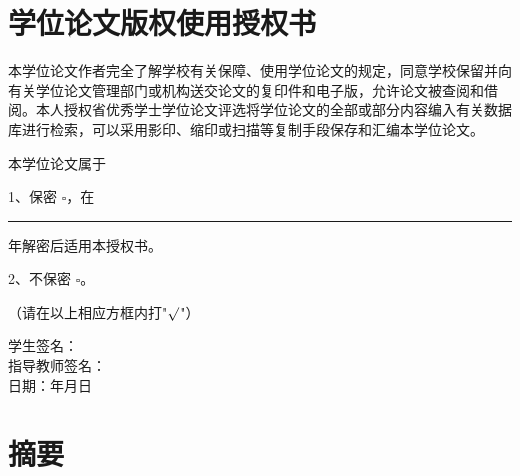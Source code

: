 \documentclass[zihao=-4,a4paper]{ctexart}
\numberwithin{figure}{section}
\numberwithin{table}{section}
\begin{document}
\newpage
\section*{学位论文版权使用授权书}
\thispagestyle{empty}

\vspace{1cm}

{\songti
本学位论文作者完全了解学校有关保障、使用学位论文的规定，同意学校保留并向有关学位论文管理部门或机构送交论文的复印件和电子版，允许论文被查阅和借阅。本人授权省优秀学士学位论文评选将学位论文的全部或部分内容编入有关数据库进行检索，可以采用影印、缩印或扫描等复制手段保存和汇编本学位论文。

\vspace{1cm}

本学位论文属于

\vspace{0.5cm}

1、保密 $\square$，在\rule{1cm}{0.3pt}年解密后适用本授权书。

\vspace{0.3cm}

2、不保密 $\square$。

\vspace{0.3cm}

（请在以上相应方框内打"$\surd$"）

\vspace{2cm}

\begin{flushright}
学生签名：\hspace{3cm}\\
\vspace{0.5cm}
指导教师签名：\hspace{3cm}\\
\vspace{0.5cm}
日\hspace{2em}期：\hspace{1cm}年\hspace{1cm}月\hspace{1cm}日
\end{flushright}
}

\newpage
\section*{摘\hspace{2em}要}
\end{document}
